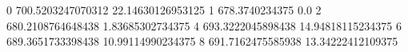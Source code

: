 0 700.5203247070312 22.14630126953125
1 678.3740234375 0.0
2 680.2108764648438 1.83685302734375
4 693.3222045898438 14.94818115234375
6 689.3651733398438 10.99114990234375
8 691.7162475585938 13.34222412109375
